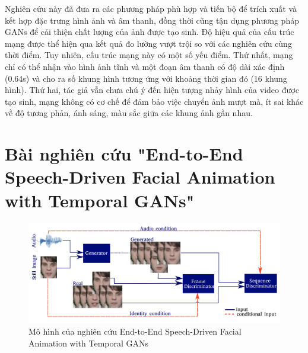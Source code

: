 Nghiên cứu này đã đưa ra các phương pháp phù hợp và tiến bộ để trích xuất và kết hợp đặc trưng hình ảnh và âm thanh, đồng thời cũng tận dụng phương pháp GANs để cải thiện chất lượng của ảnh được tạo sinh. Độ hiệu quả của cấu trúc mạng được thể hiện qua kết quả đo lường vượt trội so với các nghiên cứu cùng thời điểm. Tuy nhiên, cấu trúc mạng này có một số yếu điểm. Thứ nhất, mạng chỉ có thể nhận vào hình ảnh tĩnh và một đoạn âm thanh có độ dài xác định (0.64s) và cho ra số khung hình tương ứng với khoảng thời gian đó (16 khung hình). Thứ hai, tác giả vẫn chưa chú ý đến hiện tượng nhảy hình của video được tạo sinh, mạng không có cơ chế để đảm bảo việc chuyển ảnh mượt mà, ít sai khác về độ tương phản, ánh sáng, màu sắc giữa các khung ảnh gần nhau.


\section{Bài nghiên cứu "End-to-End Speech-Driven Facial Animation with Temporal GANs"\cite{vougioukas2019}}
\label{sec:vougioukas2019}

\begin{figure}[H]
    \centering
    \includegraphics[width=15cm]{./content/images/vou2019_model.png}
    \caption{Mô hình của nghiên cứu End-to-End Speech-Driven Facial Animation with Temporal GANs}
    \label{fig:vou2019_model}
\end{figure}

